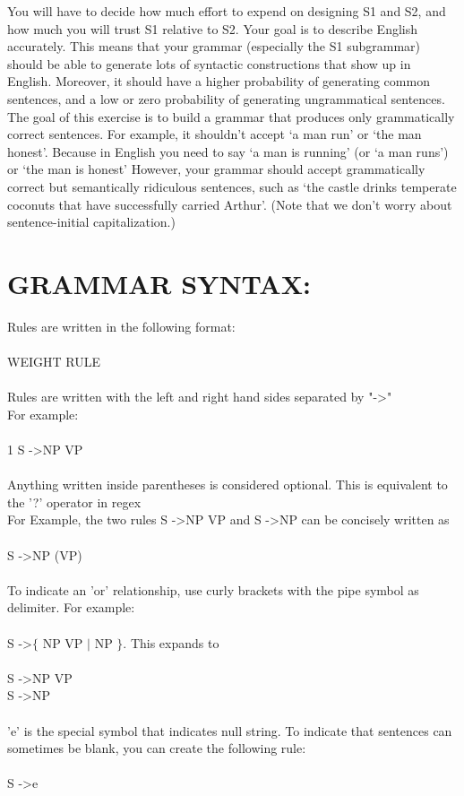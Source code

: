 \documentclass[11pt]{article}
\begin{document}
You will have to decide how much effort to expend on designing S1 and S2, and how much you will trust S1 relative to S2. Your goal is to describe English accurately. This means that your grammar (especially the S1 subgrammar) should be able to generate lots of syntactic constructions that show up in English. Moreover, it should have a higher probability of generating common sentences, and a low or zero probability of generating ungrammatical sentences. \\
The goal of this exercise is to build a grammar that produces only grammatically correct sentences. For example, it shouldn’t accept `a man run' or `the man honest'.  Because in English you need to say `a man is running' (or `a man runs') or `the man is honest' However, your grammar should accept grammatically correct but semantically ridiculous sentences, such as `the castle drinks temperate coconuts that have successfully carried Arthur'. (Note that we don’t worry about sentence-initial capitalization.) 
\section{GRAMMAR SYNTAX:}
Rules are written in the following format: \\ \\
WEIGHT \quad RULE \\ \\
Rules are written with the left and right hand sides separated by "-\textgreater" \\
For example: \\ \\
1 S -\textgreater NP VP \\ \\
Anything written inside parentheses is considered optional. This is equivalent to the '?' operator in regex \\
For Example, the two rules S -\textgreater NP VP and S -\textgreater NP can be concisely written as \\ \\ 
S -\textgreater NP (VP) \\ \\
To indicate an 'or' relationship, use curly brackets with the pipe symbol as delimiter. For example: \\ \\ 
S -\textgreater $\{$ NP VP $\mid$ NP $\}$. This expands to \\ \\
S -\textgreater NP VP \\ 
S -\textgreater NP \\ \\
'e' is the special symbol that indicates null string. To indicate that sentences can sometimes be blank, you can create the following rule: \\ \\ 
S -\textgreater e
\end{document}

